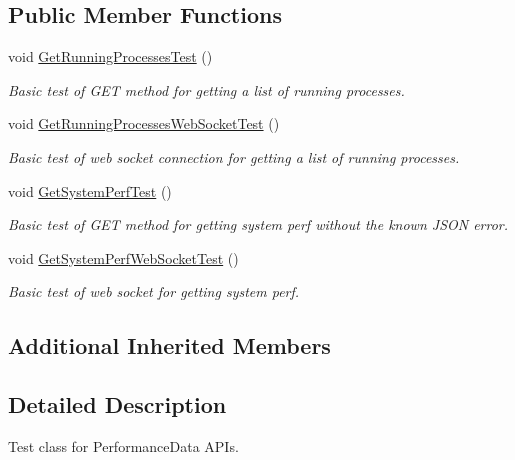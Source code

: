 \subsection*{Public Member Functions}
\begin{DoxyCompactItemize}
\item 
void \hyperlink{class_microsoft_1_1_tools_1_1_windows_device_portal_1_1_tests_1_1_core_1_1_performance_data_tests_aded628f5f7d3ab09d1564c93243a017a}{Get\+Running\+Processes\+Test} ()
\begin{DoxyCompactList}\small\item\em Basic test of G\+ET method for getting a list of running processes. \end{DoxyCompactList}\item 
void \hyperlink{class_microsoft_1_1_tools_1_1_windows_device_portal_1_1_tests_1_1_core_1_1_performance_data_tests_a55dacb5e7d2136f51d4b7051d1edecfd}{Get\+Running\+Processes\+Web\+Socket\+Test} ()
\begin{DoxyCompactList}\small\item\em Basic test of web socket connection for getting a list of running processes. \end{DoxyCompactList}\item 
void \hyperlink{class_microsoft_1_1_tools_1_1_windows_device_portal_1_1_tests_1_1_core_1_1_performance_data_tests_af8c7934bf097a124bcd276dac0646730}{Get\+System\+Perf\+Test} ()
\begin{DoxyCompactList}\small\item\em Basic test of G\+ET method for getting system perf without the known J\+S\+ON error. \end{DoxyCompactList}\item 
void \hyperlink{class_microsoft_1_1_tools_1_1_windows_device_portal_1_1_tests_1_1_core_1_1_performance_data_tests_aeae0dced640afda35d89addb9c4fb277}{Get\+System\+Perf\+Web\+Socket\+Test} ()
\begin{DoxyCompactList}\small\item\em Basic test of web socket for getting system perf. \end{DoxyCompactList}\end{DoxyCompactItemize}
\subsection*{Additional Inherited Members}


\subsection{Detailed Description}
Test class for Performance\+Data A\+P\+Is. 



